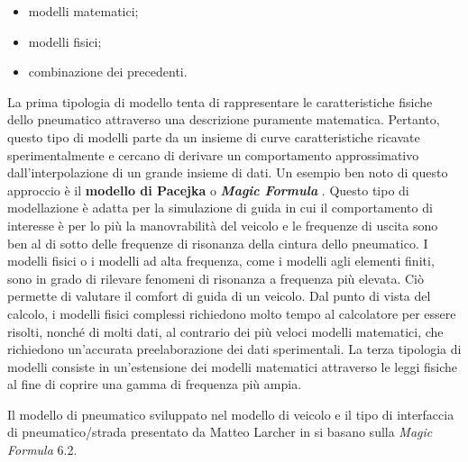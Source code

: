 \begin{itemize}
	\item modelli matematici;
	\item modelli fisici;
	\item combinazione dei precedenti.
\end{itemize}
La prima tipologia di modello tenta di rappresentare le caratteristiche fisiche dello pneumatico attraverso una descrizione puramente matematica. Pertanto, questo tipo di modelli parte da un insieme di curve caratteristiche ricavate sperimentalmente e cercano di derivare un comportamento approssimativo dall'interpolazione di un grande insieme di dati. Un esempio ben noto di questo approccio è il \textbf{modello di Pacejka} o \textbf{\textit{Magic Formula}} \cite{hans}. Questo tipo di modellazione è adatta per la simulazione di guida in cui il comportamento di interesse è per lo più la manovrabilità del veicolo e le frequenze di uscita sono ben al di sotto delle frequenze di risonanza della cintura dello pneumatico. I modelli fisici o i modelli ad alta frequenza, come i modelli agli elementi finiti, sono in grado di rilevare fenomeni di risonanza a frequenza più elevata. Ciò permette di valutare il comfort di guida di un veicolo. Dal punto di vista del calcolo, i modelli fisici complessi richiedono molto tempo al calcolatore per essere risolti, nonché di molti dati, al contrario dei più veloci modelli matematici, che richiedono un'accurata preelaborazione dei dati sperimentali. La terza tipologia di modelli consiste in un'estensione dei modelli matematici attraverso le leggi fisiche al fine di coprire una gamma di frequenza più ampia.

Il modello di pneumatico sviluppato nel modello di veicolo e il tipo di interfaccia di pneumatico/strada presentato da Matteo Larcher in \cite{Larcher} si basano sulla \textit{Magic Formula} 6.2.
%
